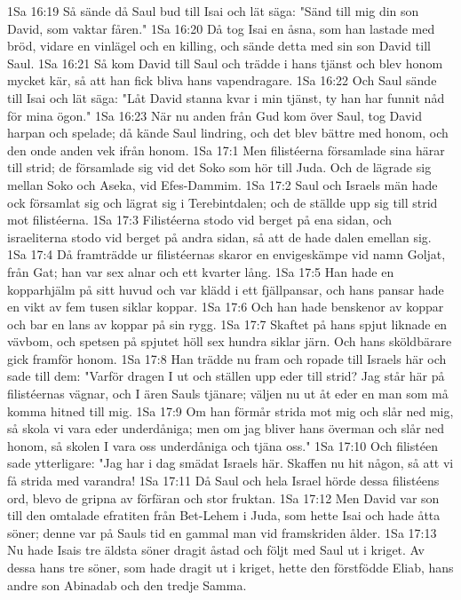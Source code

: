 1Sa 16:19  Så sände då Saul bud till Isai och lät säga: "Sänd till mig din son David, som vaktar fåren."
1Sa 16:20  Då tog Isai en åsna, som han lastade med bröd, vidare en vinlägel och en killing, och sände detta med sin son David till Saul.
1Sa 16:21  Så kom David till Saul och trädde i hans tjänst och blev honom mycket kär, så att han fick bliva hans vapendragare.
1Sa 16:22  Och Saul sände till Isai och lät säga: "Låt David stanna kvar i min tjänst, ty han har funnit nåd för mina ögon."
1Sa 16:23  När nu anden från Gud kom över Saul, tog David harpan och spelade; då kände Saul lindring, och det blev bättre med honom, och den onde anden vek ifrån honom.
1Sa 17:1  Men filistéerna församlade sina härar till strid; de församlade sig vid det Soko som hör till Juda. Och de lägrade sig mellan Soko och Aseka, vid Efes-Dammim.
1Sa 17:2  Saul och Israels män hade ock församlat sig och lägrat sig i Terebintdalen; och de ställde upp sig till strid mot filistéerna.
1Sa 17:3  Filistéerna stodo vid berget på ena sidan, och israeliterna stodo vid berget på andra sidan, så att de hade dalen emellan sig.
1Sa 17:4  Då framträdde ur filistéernas skaror en envigeskämpe vid namn Goljat, från Gat; han var sex alnar och ett kvarter lång.
1Sa 17:5  Han hade en kopparhjälm på sitt huvud och var klädd i ett fjällpansar, och hans pansar hade en vikt av fem tusen siklar koppar.
1Sa 17:6  Och han hade benskenor av koppar och bar en lans av koppar på sin rygg.
1Sa 17:7  Skaftet på hans spjut liknade en vävbom, och spetsen på spjutet höll sex hundra siklar järn. Och hans sköldbärare gick framför honom.
1Sa 17:8  Han trädde nu fram och ropade till Israels här och sade till dem: "Varför dragen I ut och ställen upp eder till strid? Jag står här på filistéernas vägnar, och I ären Sauls tjänare; väljen nu ut åt eder en man som må komma hitned till mig.
1Sa 17:9  Om han förmår strida mot mig och slår ned mig, så skola vi vara eder underdåniga; men om jag bliver hans överman och slår ned honom, så skolen I vara oss underdåniga och tjäna oss."
1Sa 17:10  Och filistéen sade ytterligare: "Jag har i dag smädat Israels här. Skaffen nu hit någon, så att vi få strida med varandra!
1Sa 17:11  Då Saul och hela Israel hörde dessa filistéens ord, blevo de gripna av förfäran och stor fruktan.
1Sa 17:12  Men David var son till den omtalade efratiten från Bet-Lehem i Juda, som hette Isai och hade åtta söner; denne var på Sauls tid en gammal man vid framskriden ålder.
1Sa 17:13  Nu hade Isais tre äldsta söner dragit åstad och följt med Saul ut i kriget. Av dessa hans tre söner, som hade dragit ut i kriget, hette den förstfödde Eliab, hans andre son Abinadab och den tredje Samma.
